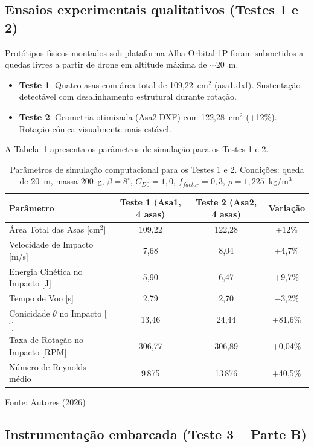 \documentclass[12pt,fleqn]{article}
\begin{document}
\subsection{Ensaios experimentais qualitativos (Testes 1 e 2)}

Protótipos físicos montados sob plataforma Alba Orbital 1P foram submetidos a quedas livres a partir de drone em altitude máxima de $\sim$20~m.

\begin{itemize}
  \item \textbf{Teste 1}: Quatro asas com área total de 109,22~cm$^2$ (asa1.dxf). Sustentação detectável com desalinhamento estrutural durante rotação.
  \item \textbf{Teste 2}: Geometria otimizada (Asa2.DXF) com 122,28~cm$^2$ (+12\%). Rotação cônica visualmente mais estável.
\end{itemize}

A Tabela~\ref{tab:testes12} apresenta os parâmetros de simulação para os Testes 1 e 2.

\begin{table}[htbp]
\caption{Parâmetros de simulação computacional para os Testes 1 e 2. Condições: queda de 20~m, massa 200~g, $\beta=8^\circ$, $C_{D0}=1,0$, $f_{factor}=0,3$, $\rho=1,225$~kg/m$^3$.}
\centering
\begin{tabular*}{\textwidth}{@{\extracolsep{\fill}}lccc}
\hline
Parâmetro & Teste 1 (Asa1, 4 asas) & Teste 2 (Asa2, 4 asas) & Variação \\
\hline
Área Total das Asas [cm$^2$] & 109,22 & 122,28 & +12\% \\
Velocidade de Impacto [m/s] & 7,68 & 8,04 & +4,7\% \\
Energia Cinética no Impacto [J] & 5,90 & 6,47 & +9,7\% \\
Tempo de Voo [s] & 2,79 & 2,70 & $-$3,2\% \\
Conicidade $\theta$ no Impacto [$^\circ$] & 13,46 & 24,44 & +81,6\% \\
Taxa de Rotação no Impacto [RPM] & 306,77 & 306,89 & +0,04\% \\
Número de Reynolds médio & 9\,875 & 13\,876 & +40,5\% \\
\hline
\end{tabular*}
{\footnotesize\centering Fonte: Autores (2026)\par}
\label{tab:testes12}
\end{table}

\subsection{Instrumentação embarcada (Teste 3 -- Parte B)}
\end{document}
